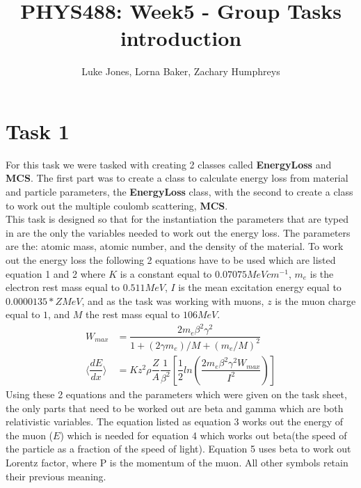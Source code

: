 \documentclass{article}
\title{PHYS488: Week5 - Group Tasks introduction}
\author{Luke Jones, Lorna Baker, Zachary Humphreys}
\begin{document}
\maketitle
\begin{abstract}
	\begin{center}
		\textit{}
	\end{center}
\end{abstract}
	

\section{Task 1}
For this task we were tasked with creating 2 classes called \textbf{EnergyLoss} and \textbf{MCS}. The first part was to create a class to calculate energy loss from material and particle parameters, the \textbf{EnergyLoss} class, with the second to create a class to work out the multiple coulomb scattering, \textbf{MCS}.\\\indent This task is designed so that for the instantiation the parameters that are typed in are the only the variables needed to work out the energy loss. The parameters are the: atomic mass, atomic number, and the density of the material. To work out the energy loss the following 2 equations have to be used which are listed equation 1 and 2 where $K$ is a constant equal to $0.07075 MeVcm^{-1}$, $m_{e}$ is the electron rest mass equal to $0.511 MeV$, $I$ is the mean excitation energy equal to $0.0000135*Z MeV$, and as the task was working with muons, $z$ is the muon charge equal to $1$, and $M$ the rest mass equal to $106 MeV$.
	\begin{align}
	W_{max}&=\dfrac{2m_e \beta^2 \gamma^2}{1+(2 \gamma m_e)/M+(m_e/M)^2}     \\
	\langle\dfrac{dE}{dx}\rangle &= Kz^2 \rho \dfrac{Z}{A}  \dfrac{1}{\beta^2} [\dfrac{1}{2} ln(\dfrac{2m_e \beta^2 \gamma^2 W_{max}}{I^2})] 
	\end{align}
Using these 2 equations and the parameters which were given on the task sheet, the only parts that need to be worked out are beta and gamma which are both relativistic variables. The equation listed as equation 3 works out the energy of the muon ($E$) which is needed for equation 4 which works out beta(the speed of the particle as a fraction of the speed of light). Equation 5 uses beta to work out Lorentz factor, where P is the momentum of the muon. All other symbols retain their previous meaning.
\end{document}
